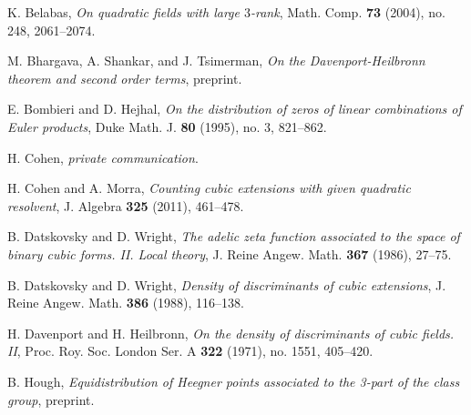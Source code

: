 \documentclass[12pt]{amsart}
\theoremstyle{remark}
\numberwithin{theorem}{section} \numberwithin{equation}{section}
\begin{document}
\begin{thebibliography}{99}

 K. Belabas,
\emph{On quadratic fields with large $3$-rank},
Math. Comp. \textbf{73} (2004), no. 248, 2061--2074.


 M. Bhargava, A. Shankar, and J. Tsimerman,
\emph{On the Davenport-Heilbronn theorem and second order terms}, preprint.

 E. Bombieri and D. Hejhal,
\emph{On the distribution of zeros of linear combinations of Euler products}, 
Duke Math. J.  \textbf{80} (1995),  no. 3, 821--862.


 H. Cohen, \emph{private communication}.

 H. Cohen and A. Morra,
\emph{Counting cubic extensions with given quadratic resolvent}, J. Algebra \textbf{325} (2011), 461--478. 

 B. Datskovsky and D. Wright,
\emph{The adelic zeta function associated to the space of binary cubic forms. II. Local theory},
J. Reine Angew. Math. \textbf{367}  (1986), 27--75.

 B. Datskovsky and D. Wright,
\emph{Density of discriminants of cubic extensions},
J. Reine Angew. Math. \textbf{386}  (1988), 116--138. 

 H. Davenport and H. Heilbronn,
\emph{On the density of discriminants of cubic fields. II}, 
Proc. Roy. Soc. London Ser. A \textbf{322}  (1971), no. 1551, 405--420. 




 B. Hough,
\emph{Equidistribution of Heegner points associated to the 3-part of the class group}, preprint.


\end{thebibliography}
\end{document}
